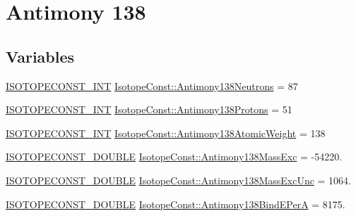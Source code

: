 \hypertarget{group___isotope_const-_antimony-_sb138}{}\section{Antimony 138}
\label{group___isotope_const-_antimony-_sb138}
\subsection*{Variables}
\begin{DoxyCompactItemize}
\item 
\mbox{\hyperlink{group___isotope_const-_macros_ga5f18360b3e99483a35c32d789e62621c}{I\+S\+O\+T\+O\+P\+E\+C\+O\+N\+S\+T\+\_\+\+I\+NT}} \mbox{\hyperlink{group___isotope_const-_antimony-_sb138_ga26c862f11241eccc2178385d8d06d72e}{Isotope\+Const\+::\+Antimony138\+Neutrons}} = 87
\item 
\mbox{\hyperlink{group___isotope_const-_macros_ga5f18360b3e99483a35c32d789e62621c}{I\+S\+O\+T\+O\+P\+E\+C\+O\+N\+S\+T\+\_\+\+I\+NT}} \mbox{\hyperlink{group___isotope_const-_antimony-_sb138_ga59adcb820c5d4ec0b91f133fe1942b33}{Isotope\+Const\+::\+Antimony138\+Protons}} = 51
\item 
\mbox{\hyperlink{group___isotope_const-_macros_ga5f18360b3e99483a35c32d789e62621c}{I\+S\+O\+T\+O\+P\+E\+C\+O\+N\+S\+T\+\_\+\+I\+NT}} \mbox{\hyperlink{group___isotope_const-_antimony-_sb138_ga00ab574512a624225210aaa8c8b15472}{Isotope\+Const\+::\+Antimony138\+Atomic\+Weight}} = 138
\item 
\mbox{\hyperlink{group___isotope_const-_macros_ga8f45a7272ce02c0b4c65c44636ed719a}{I\+S\+O\+T\+O\+P\+E\+C\+O\+N\+S\+T\+\_\+\+D\+O\+U\+B\+LE}} \mbox{\hyperlink{group___isotope_const-_antimony-_sb138_gaa35330537093595265de0ea1a16d38dd}{Isotope\+Const\+::\+Antimony138\+Mass\+Exc}} = -\/54220.
\item 
\mbox{\hyperlink{group___isotope_const-_macros_ga8f45a7272ce02c0b4c65c44636ed719a}{I\+S\+O\+T\+O\+P\+E\+C\+O\+N\+S\+T\+\_\+\+D\+O\+U\+B\+LE}} \mbox{\hyperlink{group___isotope_const-_antimony-_sb138_ga8f3974f211291839156097a2b5e81195}{Isotope\+Const\+::\+Antimony138\+Mass\+Exc\+Unc}} = 1064.
\item 
\mbox{\hyperlink{group___isotope_const-_macros_ga8f45a7272ce02c0b4c65c44636ed719a}{I\+S\+O\+T\+O\+P\+E\+C\+O\+N\+S\+T\+\_\+\+D\+O\+U\+B\+LE}} \mbox{\hyperlink{group___isotope_const-_antimony-_sb138_ga55363276eaf35a0e4f71366fcba0f200}{Isotope\+Const\+::\+Antimony138\+Bind\+E\+PerA}} = 8175.
\item 

\end{DoxyCompactItemize}
